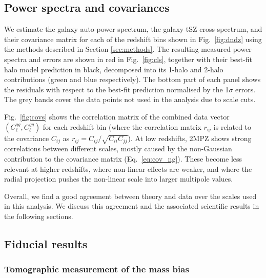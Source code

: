 \documentclass[useAMS,usenatbib]{mn2e}
\begin{document}
  \subsection{Power spectra and covariances}\label{ssec:results.cls}
    We estimate the galaxy auto-power spectrum, the galaxy-tSZ cross-spectrum, and their covariance matrix for each of the redshift bins shown in Fig.\!~\ref{fig:dndz} using the methods described in Section \ref{sec:methods}. The resulting measured power spectra and errors are shown in red in Fig.\!~\ref{fig:cls}, together with their best-fit halo model prediction in black, decomposed into its 1-halo and 2-halo contributions (green and blue respectively). The bottom part of each panel shows the residuals with respect to the best-fit prediction normalised by the 1$\sigma$ errors. The grey bands cover the data points not used in the analysis due to scale cuts.
    
    Fig.\!~\ref{fig:covs} shows the correlation matrix of the combined data vector $(C^{gg}_\ell,C^{gy}_\ell)$ for each redshift bin (where the correlation matrix $r_{ij}$ is related to the covariance $C_{ij}$ as $r_{ij}=C_{ij}/\sqrt{C_{ii}C_{jj}}$). At low redshifts, 2MPZ shows strong correlations between different scales, mostly caused by the non-Gaussian contribution to the covariance matrix (Eq.\!~\ref{eq:cov_ng}). These become less relevant at higher redshifts, where non-linear effects are weaker, and where the radial projection pushes the non-linear scale into larger multipole values.
    
    Overall, we find a good agreement between theory and data over the scales used in this analysis. We discuss this agreement and the associated scientific results in the following sections.

  \subsection{Fiducial results}\label{ssec:results.fid}  
    
    \subsubsection{Tomographic measurement of the mass bias}\label{ssec:results.fid.1mb}
\end{document}
